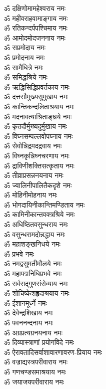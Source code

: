 \begin{multicols}{2}
\begin{flushleft}
ॐ दक्षिणोमामहेश्वराय नमः\\
ॐ महीवराहवामाङ्गाय नमः\\
ॐ रतिकन्दर्पपश्चिमाय नमः\\
ॐ आमोदमोदजननाय नमः\\
ॐ सप्रमोदाय नमः\\
ॐ प्रमोदनाय नमः\\
ॐ सामैधित्रे नमः\\
ॐ समिद्धश्रिये नमः\\
ॐ ऋद्धिसिद्धिप्रवर्तकाय नमः\\
ॐ दत्तसौमुख्यसुमुखाय नमः\hfill{}\\
ॐ कान्तिकन्दलिताश्रयाय नमः\\
ॐ मदनावत्याश्रिताङ्घ्रये नमः\\
ॐ कृतदौर्मुख्यदुर्मुखाय नमः\\
ॐ विघ्नसम्पल्लवोपघ्नाय नमः\\
ॐ सेवोन्निद्रमदद्रवाय नमः\\
ॐ विघ्नकृन्निघ्नचरणाय नमः\\
ॐ द्राविणीशक्तिसत्कृताय नमः\\
ॐ तीव्राप्रसन्ननयनाय नमः\\
ॐ ज्वालिनीपालितैकदृशे नमः\\
ॐ मोहिनीमोहनाय नमः\hfill{}\\
ॐ भोगदायिनीकान्तिमण्डिताय नमः\\
ॐ कामिनीकान्तवक्त्रश्रिये नमः\\
ॐ अधिष्ठितवसुन्धराय नमः\\
ॐ वसुन्धरामदोन्नद्धाय नमः\\
ॐ महाशङ्खनिधये नमः\\
ॐ प्रभवे नमः\\
ॐ नमद्वसुमतीमौलये नमः\\
ॐ महापद्मनिधिप्रभवे नमः\\
ॐ सर्वसद्गुणसंसेव्याय नमः\\
ॐ शोचिष्केशहृदाश्रयाय नमः\hfill{}\\
ॐ ईशानमूर्ध्ने नमः\\
ॐ देवेन्द्रशिखाय नमः\\
ॐ पवननन्दनाय नमः\\
ॐ अग्रप्रत्यग्रनयनाय नमः\\
ॐ दिव्यास्त्राणां प्रयोगविदे नमः\\
ॐ ऐरावतादिसर्वाशावारणावरण-प्रियाय नमः\\
ॐ वज्राद्यस्त्रपरीवाराय नमः\\
ॐ गणचण्डसमाश्रयाय नमः\\
ॐ जयाजयपरीवाराय नमः\\

\end{flushleft}
\end{multicols}
